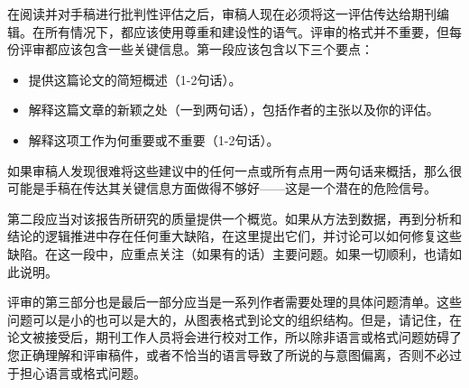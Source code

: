 在阅读并对手稿进行批判性评估之后，审稿人现在必须将这一评估传达给期刊编辑。在所有情况下，都应该使用尊重和建设性的语气。评审的格式并不重要，但每份评审都应该包含一些关键信息。第一段应该包含以下三个要点：

\begin{itemize}
\item 提供这篇论文的简短概述（1-2句话）。
\item 解释这篇文章的新颖之处（一到两句话），包括作者的主张以及你的评估。
\item 解释这项工作为何重要或不重要（1-2句话）。
\end{itemize}

如果审稿人发现很难将这些建议中的任何一点或所有点用一两句话来概括，那么很可能是手稿在传达其关键信息方面做得不够好——这是一个潜在的危险信号。

第二段应当对该报告所研究的质量提供一个概览。如果从方法到数据，再到分析和结论的逻辑推进中存在任何重大缺陷，在这里提出它们，并讨论可以如何修复这些缺陷。在这一段中，应重点关注（如果有的话）主要问题。如果一切顺利，也请如此说明。

评审的第三部分也是最后一部分应当是一系列作者需要处理的具体问题清单。这些问题可以是小的也可以是大的，从图表格式到论文的组织结构。但是，请记住，在论文被接受后，期刊工作人员将会进行校对工作，所以除非语言或格式问题妨碍了您正确理解和评审稿件，或者不恰当的语言导致了所说的与意图偏离，否则不必过于担心语言或格式问题。

